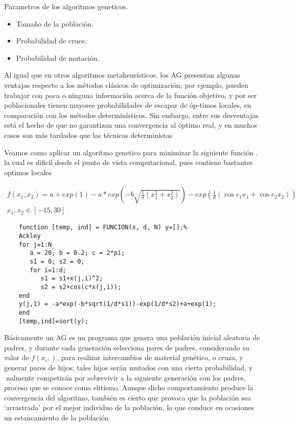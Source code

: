 \documentclass{article}
\begin{document}
Parametros de los algoritmos geneticos.
\begin{itemize}
    \item Tamaño de la población.
    \item Probabilidad de cruce.
    \item Probabilidad de mutación.
\end{itemize}

Al igual que en otros algoritmos metaheurísticos, los AG presentan algunas ventajas respecto a los métodos clásicos de optimización; por ejemplo, pueden trabajar con poca o ninguna información acerca de la función objetivo, y por ser poblacionales tienen mayores probabilidades de escapar de óp-timos locales, en comparación con los métodos determinísticos. Sin embargo, entre sus desventajas está el hecho de que no garantizan una convergencia al óptimo real, y en muchos casos son más tardados que las técnicas deterministas

Veamos como aplicar un algoritmo genetico para minimizar la siguiente función . la cual es dificil desde el punto de vista computacional, pues contiene bastantes optimos locales 

\begin{align*}
    f(x_1,x_2)=a+exp(1)-a*exp(-b\sqrt{\frac{1}{d}(x_1^2+x_2^2)})-exp(\frac{1}{d}(\cos{c_1x_1}+\cos{c_2x_2}))\\
    x_1,x_2 \in [-15,30]
\end{align*}


\begin{verbatim}
    function [temp, ind] = FUNCION(x, d, N) y=[];% 
    Ackley
    for j=1:N       
       a = 20; b = 0.2; c = 2*pi;   
       s1 = 0; s2 = 0;    
       for i=1:d;        
          s1 = s1+x(j,i)^2;       
          s2 = s2+cos(c*x(j,i));   
    end
    y(j,1) = -a*exp(-b*sqrt(1/d*s1))-exp(1/d*s2)+a+exp(1);
    end
    [temp,ind]=sort(y);
\end{verbatim}

Básicamente un AG es un programa que genera una población inicial aleatoria de padres, y durante cada generación selecciona pares de padres, considerando su valor de $f(x_i,)$, para realizar intercambios de material genético, o cruza, y generar pares de hijos; tales hijos serán mutados con una cierta probabilidad, y nalmente competirán por sobrevivir a la siguiente generación con los padres, proceso que se conoce como elitismo. Aunque dicho comportamiento produce la convergencia del algoritmo, también es cierto que provoca que la población sea ‘arrastrada’ por el mejor individuo de la población, lo que conduce en ocasiones un estancamiento de la población
\end{document}
